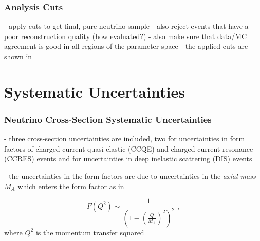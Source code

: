 

\subsubsection{Analysis Cuts} 

- apply cuts to get final, pure neutrino sample
- also reject events that have a poor reconstruction quality (how evaluated?)
- also make sure that data/MC agreement is good in all regions of the parameter space
- the applied cuts are shown in 







\section{Systematic Uncertainties} 

\subsubsection{Neutrino Cross-Section Systematic Uncertainties}


- three cross-section uncertainties are included, two for uncertainties in form factors of charged-current quasi-elastic (CCQE) and charged-current resonance (CCRES) events and for uncertainties in deep inelastic scattering (DIS) events

- the uncertainties in the form factors are due to uncertainties in the \textit{axial mass} $M_A$ which enters the form factor as in 

\begin{equation}
    F(Q^2) \sim \frac{1}{(1 - (\frac{Q}{M_A})^2)^2}
    \;,
\end{equation}
where $Q^2$ is the momentum transfer squared

